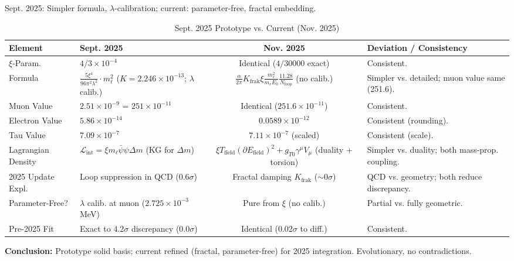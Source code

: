 \documentclass[12pt,a4paper]{article}
\begin{document}
	Sept. 2025: Simpler formula, $\lambda$-calibration; current: parameter-free, fractal embedding.
	
	\begin{table}[ht!]
		\centering
		\small
		\begin{adjustbox}{max width=\textwidth}
			\begin{tabular}{llcl}
				\toprule
				Element & Sept. 2025 & Nov. 2025 & Deviation / Consistency \\
				\midrule
				$\xi$-Param. & $4/3 \times 10^{-4}$ & Identical ($4/30000$ exact) & Consistent. \\
				Formula & $\frac{5\xi^4}{96\pi^2 \lambda^2} \cdot m_\ell^2$ ($K=2.246\times10^{-13}$; $\lambda$ calib.) & $\frac{\alpha}{2\pi} K_\text{frak} \xi \frac{m_\ell^2}{m_e E_0} \frac{11.28}{N_\text{loop}}$ (no calib.) & Simpler vs. detailed; muon value same (251.6). \\
				Muon Value & $2.51 \times 10^{-9}$ = $251 \times 10^{-11}$ & Identical ($251.6 \times 10^{-11}$) & Consistent. \\
				Electron Value & $5.86 \times 10^{-14}$ & $0.0589 \times 10^{-12}$ & Consistent (rounding). \\
				Tau Value & $7.09 \times 10^{-7}$ & $7.11 \times 10^{-7}$ (scaled) & Consistent (scale). \\
				Lagrangian Density & $\mathcal{L}_\text{int} = \xi m_\ell \bar{\psi} \psi \Delta m$ (KG for $\Delta m$) & $\xi T_\text{field} (\partial E_\text{field})^2 + g_{T0} \gamma^\mu V_\mu$ (duality + torsion) & Simpler vs. duality; both mass-prop. coupling. \\
				2025 Update Expl. & Loop suppression in QCD (0.6$\sigma$) & Fractal damping $K_\text{frak}$ ($\sim 0\sigma$) & QCD vs. geometry; both reduce discrepancy. \\
				Parameter-Free? & $\lambda$ calib. at muon ($2.725 \times 10^{-3}$ MeV) & Pure from $\xi$ (no calib.) & Partial vs. fully geometric. \\
				Pre-2025 Fit & Exact to 4.2$\sigma$ discrepancy (0.0$\sigma$) & Identical (0.02$\sigma$ to diff.) & Consistent. \\
				\bottomrule
			\end{tabular}
		\end{adjustbox}
		\caption{Sept. 2025 Prototype vs. Current (Nov. 2025)}
		\label{tab:prototype_comparison}
	\end{table}
	
	\textbf{Conclusion:} Prototype solid basis; current refined (fractal, parameter-free) for 2025 integration. Evolutionary, no contradictions.
	
\end{document}
